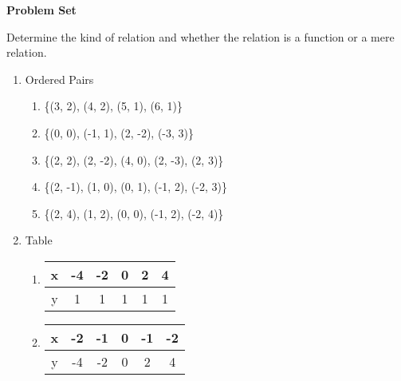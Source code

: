 \def \curdir {/host-rootfs/storage/emulated/0/Documents/documents/latex/1920/Grade-8/2nd/functions/f}

\textbf{Problem Set}

\vspce

Determine the kind of relation and whether the relation is a function or a mere relation. 

\begin{enumerate}[label = \Alph*. ]
\item Ordered Pairs 
 
\begin{enumerate}[label = \arabic*. ]
\item \hspce  \{(3, 2), (4, 2), (5, 1), (6, 1)\}
\item \hspce  \{(0, 0), (-1, 1), (2, -2), (-3, 3)\}

\item \hspce  \{(2, 2), (2, -2), (4, 0), (2, -3), (2, 3)\}

\item \hspce  \{(2, -1), (1, 0), (0, 1), (-1, 2), (-2, 3)\}

\item \hspce  \{(2, 4), (1, 2), (0, 0), (-1, 2), (-2, 4)\}

\end{enumerate}

\item Table

\begin{enumerate}[label = \arabic*. ]
\item \hspce  
\begin{tabular}{|c|c|c|c|c|c|}
\hline 
x & -4 & -2 & 0 & 2 & 4 \\
\hline 
y & 1 & 1 & 1 & 1 & 1 \\
\hline 
\end{tabular}

\item \hspce  
\begin{tabular}{|c|c|c|c|c|c|}
\hline 
x & -2 & -1 & 0 & -1 & -2 \\
\hline 
y & -4 & -2 & 0 & 2 & 4 \\
\hline 
\end{tabular}


\end{enumerate}
\end{enumerate}
